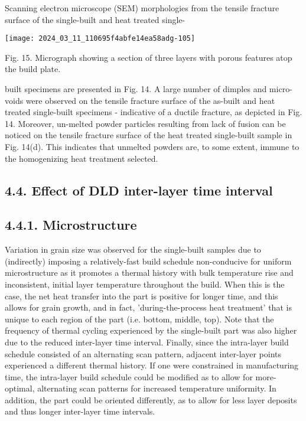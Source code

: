 \documentclass[10pt]{article}
\begin{document}
Scanning electron microscope (SEM) morphologies from the tensile fracture surface of the single-built and heat treated single-

\begin{center}
\texttt{[image: 2024\_03\_11\_110695f4abfe14ea58adg-105]}
\end{center}

Fig. 15. Micrograph showing a section of three layers with porous features atop the build plate.

built specimens are presented in Fig. 14. A large number of dimples and micro-voids were observed on the tensile fracture surface of the as-built and heat treated single-built specimens - indicative of a ductile fracture, as depicted in Fig. 14. Moreover, un-melted powder particles resulting from lack of fusion can be noticed on the tensile fracture surface of the heat treated single-built sample in Fig. 14(d). This indicates that unmelted powders are, to some extent, immune to the homogenizing heat treatment selected.

\subsection*{4.4. Effect of DLD inter-layer time interval}
\subsection*{4.4.1. Microstructure}
Variation in grain size was observed for the single-built samples due to (indirectly) imposing a relatively-fast build schedule non-conducive for uniform microstructure as it promotes a thermal history with bulk temperature rise and inconsistent, initial layer temperature throughout the build. When this is the case, the net heat transfer into the part is positive for longer time, and this allows for grain growth, and in fact, 'during-the-process heat treatment' that is unique to each region of the part (i.e. bottom, middle, top). Note that the frequency of thermal cycling experienced by the single-built part was also higher due to the reduced inter-layer time interval. Finally, since the intra-layer build schedule consisted of an alternating scan pattern, adjacent inter-layer points experienced a different thermal history. If one were constrained in manufacturing time, the intra-layer build schedule could be modified as to allow for more-optimal, alternating scan patterns for increased temperature uniformity. In addition, the part could be oriented differently, as to allow for less layer deposits and thus longer inter-layer time intervals.
\end{document}
